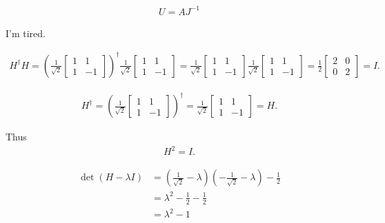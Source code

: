 \begin{align*}
	U = AJ^{-1}
\end{align*}

I'm tired.





\begin{align*}
	H^\dagger H = \left(\frac{1}{\sqrt{2}} \begin{bmatrix}
	1 & 1 \\
	1 & -1
	\end{bmatrix}\right)^\dagger
	\frac{1}{\sqrt{2}} \begin{bmatrix}
	1 & 1 \\
	1 & -1
	\end{bmatrix}
	=
	\frac{1}{\sqrt{2}} \begin{bmatrix}
	1 & 1 \\
	1 & -1
	\end{bmatrix}
	\frac{1}{\sqrt{2}} \begin{bmatrix}
	1 & 1 \\
	1 & -1
	\end{bmatrix}
	=
	\frac{1}{2} \begin{bmatrix}
	2 & 0 \\
	0 & 2
	\end{bmatrix}
	=
	I.
\end{align*}





\begin{align*}
	H^\dagger = \left(\frac{1}{\sqrt{2}} \begin{bmatrix}
	1 & 1 \\
	1 & -1
	\end{bmatrix}\right)^\dagger
	=
	\frac{1}{\sqrt{2}} \begin{bmatrix}
	1 & 1 \\
	1 & -1
	\end{bmatrix}
	=
	H.
\end{align*}

Thus
\begin{align*}
	H^2 = I.
\end{align*}




\begin{align*}
	\det \left(H - \lambda I\right) &= \left(\frac{1}{\sqrt{2}} - \lambda \right) \left(- \frac{1}{\sqrt{2}} - \lambda \right) - \frac{1}{2}\\
		&= \lambda^2 - \frac{1}{2} - \frac{1}{2}\\
		&= \lambda^2 - 1
\end{align*}

